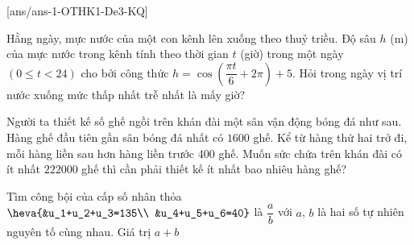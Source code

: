 [ans/ans-1-OTHK1-De3-KQ]
\caukq
\begin{ex}%
	Hằng ngày, mực nước của một con kênh lên xuống theo thuỷ triều. Độ sâu $h$ (m) của mực nước trong kênh tính theo thời gian $t$ (giờ) trong một ngày $(0 \leq t<24)$ cho bởi công thức $h=\cos \left(\dfrac{\pi t}{6}+2 \pi\right)+5$. Hỏi trong ngày vị trí nước xuống mức thấp nhất trễ nhất là mấy giờ?
\end{ex}
\begin{ex}%
	Người ta thiết kế số ghế ngồi trên khán đài một sân vận động bóng đá như sau. Hàng ghế đầu tiên gần sân bóng đá nhất có $1600$ ghế. Kể từ hàng thứ hai trở đi, mỗi hàng liền sau hơn hàng liền trước 400 ghế. Muốn sức chứa trên khán đài có ít nhất $222000$ ghế thì cần phải thiết kế ít nhất bao nhiêu hàng ghế?
\end{ex}
\begin{ex}%
	Tìm công bội của cấp số nhân thỏa $\heva{&u_1+u_2+u_3=135\\	&u_4+u_5+u_6=40}$ là $\dfrac{a}{b}$ với $a$, $b$ là hai số tự nhiên nguyên tố cùng nhau. Giá trị $a+b$
\end{ex}
